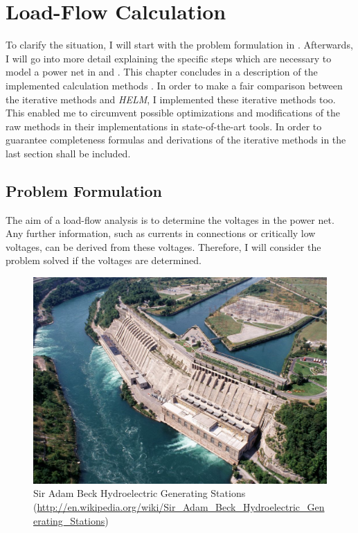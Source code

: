 \chapter{Load-Flow Calculation}

To clarify the situation, I will start with the problem formulation in . Afterwards, I will go into more detail explaining the specific steps which are necessary to model a power net in  and . This chapter concludes in a description of the implemented calculation methods . In order to make a fair comparison between the iterative methods and \emph{HELM}, I implemented these iterative methods too. This enabled me to circumvent possible optimizations and modifications of the raw methods in their implementations in state-of-the-art tools. In order to guarantee completeness formulas and derivations of the iterative methods in the last section shall be included.

\section{Problem Formulation}
\label{sec:problem_formulation}

The aim of a load-flow analysis is to determine the voltages in the power net. Any further information, such as currents in connections or critically low voltages, can be derived from these voltages. Therefore, I will consider the problem solved if the voltages are determined.

\begin{figure}
	\centering
	\includegraphics[width=\textwidth]{figures/adam_beck_complex.jpg}
	\caption[Sir Adam Beck Hydroelectric Generating Stations]{Sir Adam Beck Hydroelectric Generating Stations (\small{\url{http://en.wikipedia.org/wiki/Sir_Adam_Beck_Hydroelectric_Generating_Stations}})}
	\label{fig:power_plant}
\end{figure}

